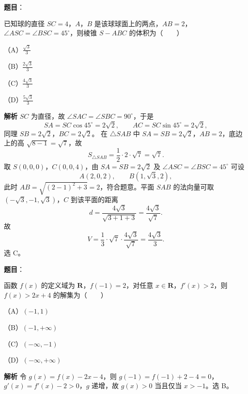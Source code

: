 \begin{answer}

\textbf{题目}：

已知球的直径 $SC=4$，$A$，$B$ 是该球球面上的两点，$AB=2$，$\angle ASC=\angle BSC=45^\circ$，则棱锥 $S-ABC$ 的体积为\mbox{（　　）}

（A）$\frac{\sqrt3}3$

（B）$\frac{2\sqrt3}3$

（C）$\frac{4\sqrt3}3$

（D）$\frac{5\sqrt3}3$

\textbf{解析}
$SC$ 为直径，故 $\angle SAC=\angle SBC=90^\circ$，于是
\nopagebreak[4]
\[SA=SC\cos45^\circ=2\sqrt2,\qquad AC=SC\sin45^\circ=2\sqrt2,\]
同理 $SB=2\sqrt2$，$BC=2\sqrt2$。
在 $\triangle SAB$ 中 $SA=SB=2\sqrt2$，$AB=2$，底边上的高 $\sqrt{8-1}=\sqrt7$，故
\nopagebreak[4]
\[S_{\triangle SAB}=\frac12\cdot2\cdot\sqrt7=\sqrt7.\]
取 $S(0,0,0)$，$C(0,0,4)$，由 $SA=SB=2\sqrt2$ 及 $\angle ASC=\angle BSC=45^\circ$ 可设
\nopagebreak[4]
\[A(2,0,2),\qquad B(1,\sqrt3,2),\]
此时 $AB=\sqrt{(2-1)^2+3}=2$，符合题意。平面 $SAB$ 的法向量可取 $(-\sqrt3,-1,\sqrt3)$，$C$ 到该平面的距离
\nopagebreak[4]
\[d=\frac{4\sqrt3}{\sqrt{3+1+3}}=\frac{4\sqrt3}{\sqrt7}.\]
故
\nopagebreak[4]
\[V=\frac13\cdot\sqrt7\cdot\frac{4\sqrt3}{\sqrt7}=\frac{4\sqrt3}3.\]
选 C。


\end{answer}
\begin{answer}

\textbf{题目}：

函数 $f(x)$ 的定义域为 $\mathbf R$，$f(-1)=2$，对任意 $x\in\mathbf R$，$f'(x)>2$，则 $f(x)>2x+4$ 的解集为\mbox{（　　）}

（A）$(-1,1)$

（B）$(-1,+\infty)$

（C）$(-\infty,-1)$

（D）$(-\infty,+\infty)$

\textbf{解析}
令 $g(x)=f(x)-2x-4$，则 $g(-1)=f(-1)+2-4=0$，$g'(x)=f'(x)-2>0$，$g$ 递增，故 $g(x)>0$ 当且仅当 $x>-1$。选 B。


\end{answer}
